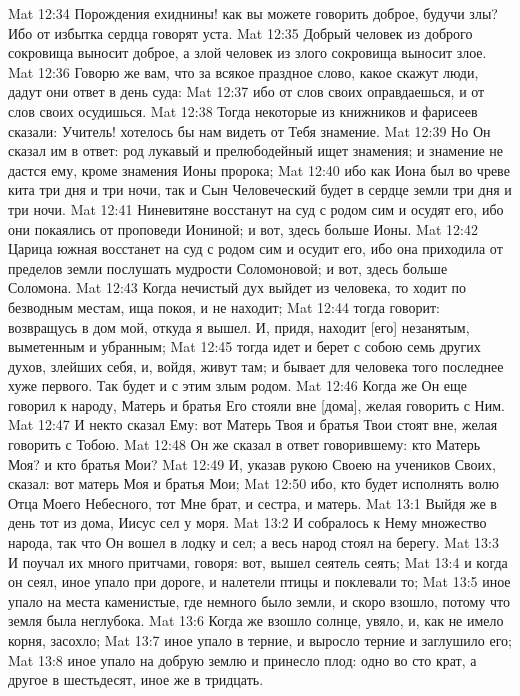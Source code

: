 Mat 12:34  Порождения ехиднины! как вы можете говорить доброе, будучи злы? Ибо от избытка сердца говорят уста.
Mat 12:35  Добрый человек из доброго сокровища выносит доброе, а злой человек из злого сокровища выносит злое.
Mat 12:36  Говорю же вам, что за всякое праздное слово, какое скажут люди, дадут они ответ в день суда:
Mat 12:37  ибо от слов своих оправдаешься, и от слов своих осудишься.
Mat 12:38  Тогда некоторые из книжников и фарисеев сказали: Учитель! хотелось бы нам видеть от Тебя знамение.
Mat 12:39  Но Он сказал им в ответ: род лукавый и прелюбодейный ищет знамения; и знамение не дастся ему, кроме знамения Ионы пророка;
Mat 12:40  ибо как Иона был во чреве кита три дня и три ночи, так и Сын Человеческий будет в сердце земли три дня и три ночи.
Mat 12:41  Ниневитяне восстанут на суд с родом сим и осудят его, ибо они покаялись от проповеди Иониной; и вот, здесь больше Ионы.
Mat 12:42  Царица южная восстанет на суд с родом сим и осудит его, ибо она приходила от пределов земли послушать мудрости Соломоновой; и вот, здесь больше Соломона.
Mat 12:43  Когда нечистый дух выйдет из человека, то ходит по безводным местам, ища покоя, и не находит;
Mat 12:44  тогда говорит: возвращусь в дом мой, откуда я вышел. И, придя, находит [его] незанятым, выметенным и убранным;
Mat 12:45  тогда идет и берет с собою семь других духов, злейших себя, и, войдя, живут там; и бывает для человека того последнее хуже первого. Так будет и с этим злым родом.
Mat 12:46  Когда же Он еще говорил к народу, Матерь и братья Его стояли вне [дома], желая говорить с Ним.
Mat 12:47  И некто сказал Ему: вот Матерь Твоя и братья Твои стоят вне, желая говорить с Тобою.
Mat 12:48  Он же сказал в ответ говорившему: кто Матерь Моя? и кто братья Мои?
Mat 12:49  И, указав рукою Своею на учеников Своих, сказал: вот матерь Моя и братья Мои;
Mat 12:50  ибо, кто будет исполнять волю Отца Моего Небесного, тот Мне брат, и сестра, и матерь.
Mat 13:1  Выйдя же в день тот из дома, Иисус сел у моря.
Mat 13:2  И собралось к Нему множество народа, так что Он вошел в лодку и сел; а весь народ стоял на берегу.
Mat 13:3  И поучал их много притчами, говоря: вот, вышел сеятель сеять;
Mat 13:4  и когда он сеял, иное упало при дороге, и налетели птицы и поклевали то;
Mat 13:5  иное упало на места каменистые, где немного было земли, и скоро взошло, потому что земля была неглубока.
Mat 13:6  Когда же взошло солнце, увяло, и, как не имело корня, засохло;
Mat 13:7  иное упало в терние, и выросло терние и заглушило его;
Mat 13:8  иное упало на добрую землю и принесло плод: одно во сто крат, а другое в шестьдесят, иное же в тридцать.
